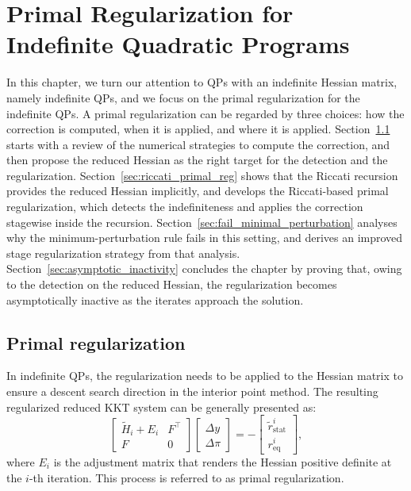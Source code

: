 \documentclass[class=scrbook, crop=false]{standalone}
\begin{document}
\chapter{Primal Regularization for Indefinite Quadratic Programs}
\label{Chapter::Primal_Regularization}
In this chapter, we turn our attention to QPs with an indefinite Hessian matrix, namely indefinite QPs,
and we focus on the primal regularization for the indefinite QPs.
A primal regularization can be regarded by three choices:
how the correction is computed, when it is applied, and where it is applied.
Section~\ref{sec:hessian_reg} starts with a review of the numerical strategies to compute the correction, 
and then propose the reduced Hessian as the right target for the detection and the regularization.
Section~\ref{sec:riccati_primal_reg} shows that the Riccati recursion provides the reduced Hessian implicitly,
and develops the Riccati-based primal regularization, 
which detects the indefiniteness and applies the correction stagewise inside the recursion.
Section~\ref{sec:fail_minimal_perturbation} analyses why the minimum-perturbation rule fails in this setting,
and derives an improved stage regularization strategy from that analysis.
Section~\ref{sec:asymptotic_inactivity} concludes the chapter by proving that, 
owing to the detection on the reduced Hessian,
the regularization becomes asymptotically inactive as the iterates approach the solution.

\section{Primal regularization}
\label{sec:hessian_reg}
In indefinite QPs, the regularization needs to be applied to the Hessian matrix to ensure a descent search direction in the interior point method.
The resulting regularized reduced KKT system can be generally presented as:
\begin{equation}
    \begin{bmatrix}
     \tilde{H}_i + E_i & F^\top \\
    F & 0
    \end{bmatrix}
    \begin{bmatrix}
    \Delta y \\
    \Delta \pi
    \end{bmatrix} = -
    \begin{bmatrix}
    \tilde{r}_{\mathrm{stat}}^i \\
    r_{\mathrm{eq}}^i
    \end{bmatrix},
\end{equation}
where $E_i$ is the adjustment matrix that renders the Hessian positive definite at the $i$-th iteration.
This process is referred to as primal regularization.
\end{document}
